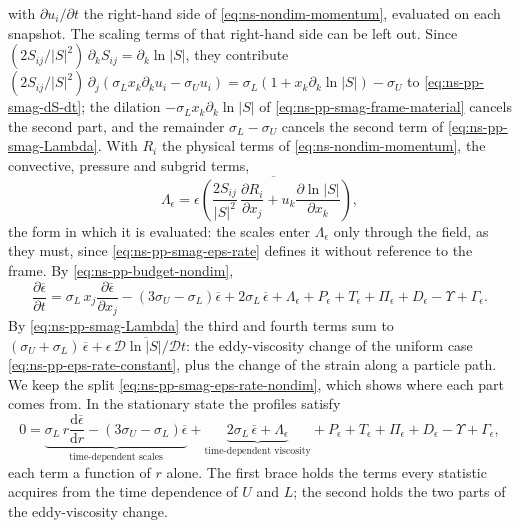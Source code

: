 \documentclass{article}
\begin{document}
with $\partial u_i / \partial t$ the right-hand side of
\eqref{eq:ns-nondim-momentum}, evaluated on each snapshot. The scaling
terms of that right-hand side can be left out. Since
$(2S_{ij}/|S|^2)\, \partial_k S_{ij} = \partial_k \ln |S|$, they contribute
$(2S_{ij}/|S|^2)\, \partial_j(\sigma_L x_k \partial_k u_i - \sigma_U u_i)
= \sigma_L (1 + x_k \partial_k \ln |S|) - \sigma_U$ to
\eqref{eq:ns-pp-smag-dS-dt}; the dilation $-\sigma_L x_k \partial_k \ln|S|$
of \eqref{eq:ns-pp-smag-frame-material} cancels the second part, and the
remainder $\sigma_L - \sigma_U$ cancels the second term of
\eqref{eq:ns-pp-smag-Lambda}. With $R_i$ the physical terms of
\eqref{eq:ns-nondim-momentum}, the convective, pressure and subgrid terms,
\begin{equation}\label{eq:ns-pp-smag-Lambda-phys}
  \Lambda_\epsilon
  = \overline{\epsilon \left( \frac{2 S_{ij}}{|S|^2}\, \frac{\partial R_i}{\partial x_j}
  + u_k \frac{\partial \ln |S|}{\partial x_k} \right)} ,
\end{equation}
the form in which it is evaluated: the scales enter $\Lambda_\epsilon$
only through the field, as they must, since \eqref{eq:ns-pp-smag-eps-rate}
defines it without reference to the frame. By
\eqref{eq:ns-pp-budget-nondim},
\begin{equation}\label{eq:ns-pp-smag-eps-rate-nondim}
  \frac{\partial \overline{\epsilon}}{\partial t}
  = \sigma_L\, x_j \frac{\partial \overline{\epsilon}}{\partial x_j}
  - \left( 3\sigma_U - \sigma_L \right) \overline{\epsilon}
  + 2 \sigma_L\, \overline{\epsilon}
  + \Lambda_\epsilon
  + P_\epsilon + T_\epsilon + \Pi_\epsilon + D_\epsilon - \Upsilon
  + \Gamma_\epsilon .
\end{equation}
By \eqref{eq:ns-pp-smag-Lambda} the third and fourth terms sum to
$(\sigma_U + \sigma_L)\, \overline{\epsilon}
+ \overline{\epsilon\, \mathcal{D} \ln |S| / \mathcal{D} t}$: the
eddy-viscosity change of the uniform case
\eqref{eq:ns-pp-eps-rate-constant}, plus the change of the strain along a
particle path. We keep the split \eqref{eq:ns-pp-smag-eps-rate-nondim},
which shows where each part comes from. In the stationary state the profiles satisfy
\begin{equation}\label{eq:ns-pp-smag-eps-radial}
  0 = \underbrace{\sigma_L\, r \frac{\mathrm{d} \overline{\epsilon}}{\mathrm{d} r}
  - \left( 3\sigma_U - \sigma_L \right) \overline{\epsilon}}_{\text{time-dependent scales}}
  + \underbrace{2 \sigma_L\, \overline{\epsilon}
  + \Lambda_\epsilon}_{\text{time-dependent viscosity}}
  + P_\epsilon + T_\epsilon + \Pi_\epsilon + D_\epsilon - \Upsilon
  + \Gamma_\epsilon ,
\end{equation}
each term a function of $r$ alone. The first brace holds the terms every
statistic acquires from the time dependence of $U$ and $L$; the second holds
the two parts of the eddy-viscosity change.
\end{document}
